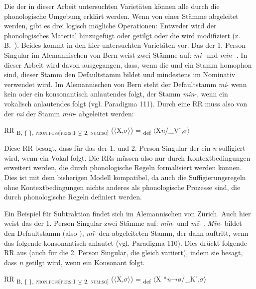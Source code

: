 \begin{exe}
\begin{exe}
Die  der in dieser Arbeit untersuchten Varietäten können alle durch die phonologische Umgebung erklärt werden. Wenn von einer  Stämme abgeleitet werden, gibt es drei logisch mögliche Operationen: Entweder wird der  phonologisches Material hinzugefügt oder getilgt oder die  wird modifiziert (z.\,B.\ ). Beides kommt in den hier untersuchten Varietäten vor. Das  der 1. Person Singular im Alemannischen von Bern weist zwei Stämme auf: \textit{mi}- und \textit{min}- \citep[99]{Marti1985}. In dieser Arbeit wird davon ausgegangen, dass, wenn die  und ein Stamm homophon sind, dieser Stamm den Defaultstamm bildet und mindestens im Nominativ verwendet wird. Im Alemannischen von Bern steht der Defaultstamm \textit{mi}- wenn kein oder ein konsonantisch anlautendes  folgt, der Stamm \mbox{\textit{min}-,} wenn ein vokalisch anlautendes  folgt (vgl. Paradigma 111). Durch eine RR muss also von der  \textit{mi} der Stamm \textit{min}- abgeleitet werden:

\ea%
    \label{ex:key:42}
RR \textsubscript{B, \{ \}, \textsc{pron.poss}[\textsc{pers:1}} \textsubscript{${\veebar}$} \textsubscript{2, \textsc{num:sg}]} ($\langle$X,$\sigma$$\rangle$) = \textsubscript{def} $\langle$X\textit{n}/\_Vˊ,$\sigma$$\rangle$
\z 

Diese RR besagt, dass für das  der 1. und 2. Person Singular der  ein \textit{n} suffigiert wird, wenn ein Vokal folgt. Die RRs müssen also nur durch Kontextbedingungen erweitert werden, die durch phonologische Regeln formalisiert werden können. Dies ist mit dem bisherigen Modell kompatibel, da auch die Suffigierungsregeln ohne Kontextbedingungen nichts anderes als phonologische Prozesse sind, die durch phonologische Regeln definiert werden.\largerpage

Ein Beispiel für Subtraktion findet sich im Alemannischen von Zürich. Auch hier weist das  der 1. Person Singular zwei Stämme auf: \textit{m\=in}- und \textit{m\=i}- \citep[135]{Weber1987}. \textit{M\=in}- bildet den Defaultstamm (also ), \textit{m\=i}- den abgeleiteten Stamm, der dann auftritt, wenn das folgende  konsonantisch anlautet (vgl. Paradigma 110). Dies drückt folgende RR aus (auch für die 2. Person Singular, die gleich variiert), indem sie besagt, dass \textit{n} getilgt wird, wenn ein Konsonant folgt.

\ea%
    \label{ex:key:43}
RR \textsubscript{B, \{ \}, \textsc{pron.poss}[\textsc{pers:1}} \textsubscript{${\veebar}$} \textsubscript{2, \textsc{num:sg}]} ($\langle$X,$\sigma$$\rangle$) = \textsubscript{def} $\langle$X *\textit{n}→ø/\_Kˊ,$\sigma$$\rangle$
\z


\end{exe}
\end{exe}
